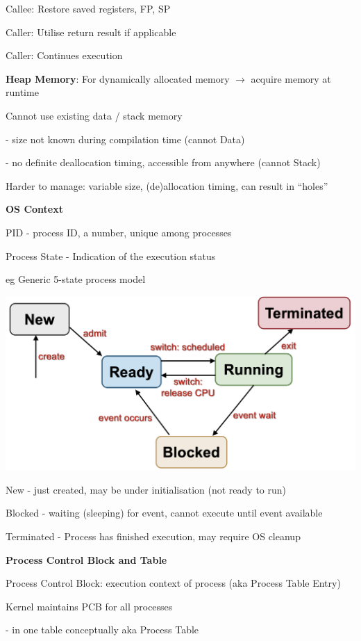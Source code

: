 \documentclass[10pt, a4paper]{article}
\newcommand{\red}[1]{{\color{red}#1}}
\newcommand{\green}[1]{{\color{ForestGreen}#1}}
\begin{document}
\begin{multicols*}{3}
		\green{Callee:} Restore saved registers, FP, SP

		\red{Caller:} Utilise return result if applicable

		\red{Caller:} Continues execution
		
		\textbf{Heap Memory}: For dynamically allocated memory $\rightarrow$ acquire memory at runtime

		Cannot use existing data / stack memory

		- size not known during compilation time (cannot Data)

		- no definite deallocation timing, accessible from anywhere (cannot Stack)

		Harder to manage: variable size, (de)allocation timing, can result in ``holes''

		\textbf{OS Context}

		PID - process ID, a number, unique among processes

		Process State - Indication of the execution status

		eg Generic 5-state process model

		\includegraphics[scale=.2]{./assets/5ProcessState.png}

		New - just created, may be under initialisation (not ready to run)

		Blocked - waiting (sleeping) for event, cannot execute until event available

		Terminated - Process has finished execution, may require OS cleanup

		\textbf{Process Control Block and Table}

		Process Control Block: execution context of process (aka Process Table Entry)

		Kernel maintains PCB for all processes

		- in one table conceptually aka Process Table


\end{multicols*}
\end{document}
